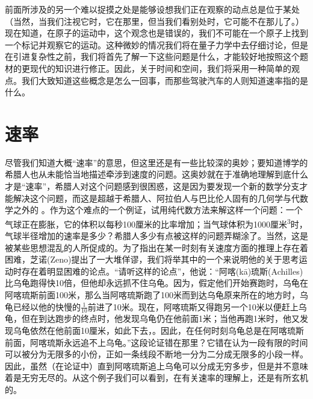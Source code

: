 \documentclass[12pt,oneside]{book}
\begin{document}
\begin{common-format}
前面所涉及的另一个难以捉摸之处是能够设想我们正在观察的动点总是位于某处（当然，当我们注视它时，它在那里，但当我们看别处时，它可能不在那儿了。）现在知道，在原子的运动中，这个观念也是错误的，我们不可能在一个原子上找到一个标记并观察它的运动。这种微妙的情况我们将在量子力学中去仔细讨论，但是在引进复杂性之前，我们将首先了解一下这些问题是什么，才能较好地按照这个题材的更现代的知识进行修正。因此，关于时间和空间，我们将采用一种简单的观点。我们大致知道这些概念是怎么一回事，而那些驾驶汽车的人则知道速率指的是什么。



\section{速率}
尽管我们知道大概“速率”的意思，但这里还是有一些比较深的奥妙；要知道博学的希腊人也从未能恰当地描述牵涉到速度的问题。这奥妙就在于准确地理解到底什么才是“速率”，希腊人对这个问题感到很困惑，这是因为要发现一个新的数学分支才能解决这个问题，而这是超越于希腊人、阿拉伯人与巴比伦人固有的几何学与代数学之外的 。作为这个难点的一个例证，试用纯代数方法来解这样一个问题：一个气球正在膨胀，它的体积以每秒100厘米的比率增加；当气球体积为1000\si{厘米^3}时，气球半径增加的速率是多少？希腊人多少有点被这样的问题弄糊涂了。当然，这是被某些思想混乱的人所促成的。为了指出在某一时刻有关速度方面的推理上存在着困难，芝诺(Zeno)提出了一大堆佯谬，我们将举其中的一个来说明他的关于思考运动时存在着明显困难的论点。“请听这样的论点”，他说：“阿喀(kā)琉斯(Achilles)比乌龟跑得快10倍，但他却永远抓不住乌龟。因为，假定他们开始赛跑时，乌龟在阿喀琉斯前面100米，那么当阿喀琉斯跑了100米而到达乌龟原来所在的地方时，乌龟已经以他的快慢的$\frac{1}{10}$前进了10米。现在，阿喀琉斯又得跑另一个10米以便赶上乌龟，但在到达跑步的终点时，他发现乌龟仍在他前面1米；当他再跑1米时，他又发现乌龟依然在他前面10厘米，如此下去，。因此，在任何时刻乌龟总是在阿喀琉斯前面，阿喀琉斯永远追不上乌龟。”这段论证错在那里？它错在认为一段有限的时间可以被分为无限多的小份，正如一条线段不断地一分为二分成无限多的小段一样。因此，虽然（在论证中）直到阿喀琉斯追上乌龟可以分成无穷多步，但是并不意味着是无穷无尽的。从这个例子我们可以看到，在有关速率的理解上，还是有所玄机的。


\end{common-format}
\end{document}
